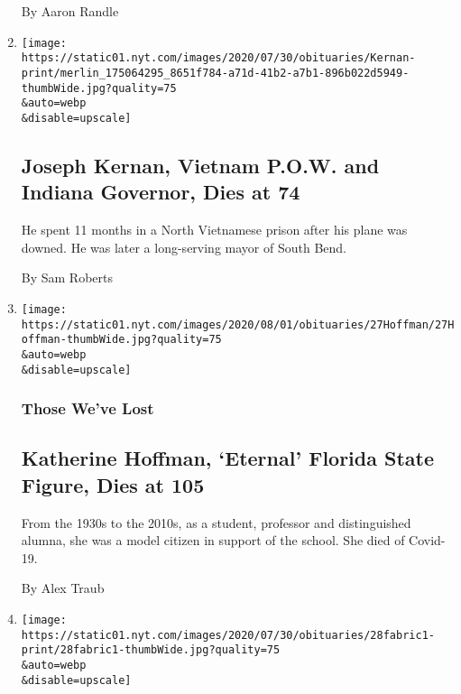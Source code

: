 \begin{enumerate}
  By Aaron Randle
\item
  \href{/2020/07/29/us/politics/joseph-kernan-dead.html}{}

  \texttt{[image: https://static01.nyt.com/images/2020/07/30/obituaries/Kernan-print/merlin\_175064295\_8651f784-a71d-41b2-a7b1-896b022d5949-thumbWide.jpg?quality=75\\\&auto=webp\\\&disable=upscale]}

  \hypertarget{joseph-kernan-vietnam-pow-and-indiana-governor-dies-at-74}{%
  \subsection{Joseph Kernan, Vietnam P.O.W. and Indiana Governor, Dies
  at
  74}\label{joseph-kernan-vietnam-pow-and-indiana-governor-dies-at-74}}

  He spent 11 months in a North Vietnamese prison after his plane was
  downed. He was later a long-serving mayor of South Bend.

  By Sam Roberts
\item
  \href{/2020/07/29/obituaries/katherine-hoffman-dead-coronavirus.html}{}

  \texttt{[image: https://static01.nyt.com/images/2020/08/01/obituaries/27Hoffman/27Hoffman-thumbWide.jpg?quality=75\\\&auto=webp\\\&disable=upscale]}

  \hypertarget{those-weve-lost-2}{%
  \subsubsection{Those We've Lost}\label{those-weve-lost-2}}

  \hypertarget{katherine-hoffman-eternal-florida-state-figure-dies-at-105}{%
  \subsection{Katherine Hoffman, `Eternal' Florida State Figure, Dies at
  105}\label{katherine-hoffman-eternal-florida-state-figure-dies-at-105}}

  From the 1930s to the 2010s, as a student, professor and distinguished
  alumna, she was a model citizen in support of the school. She died of
  Covid-19.

  By Alex Traub
\item
  \href{/2020/07/29/arts/music/bent-fabric-dead.html}{}

  \texttt{[image: https://static01.nyt.com/images/2020/07/30/obituaries/28fabric1-print/28fabric1-thumbWide.jpg?quality=75\\\&auto=webp\\\&disable=upscale]}


\end{enumerate}
